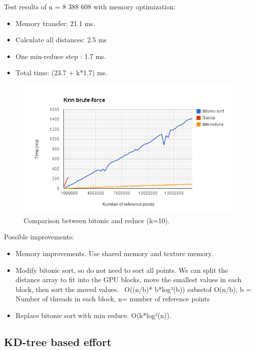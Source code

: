 \begin{enumerate}
\begin{enumerate}
Test results of n = 8 388 608 with memory optimization:
\begin{itemize}
    \item Memory transfer:  21.1 ms.
    \item Calculate all distances: 2.5 ms
    \item One min-reduce step : 1.7 ms.
    \item Total time: (23.7 + k*1.7) ms.
\end{itemize}

\begin{figure}[ht!]
\centering
\includegraphics[width=120mm]{gfx/BitonicVSreduce.png}

\caption{Comparison between bitonic and reduce (k=10).}
\label{fig:bitonic_vs_reduce}
\end{figure}

Possible improvements:

\begin{itemize}
    \item Memory improvements. Use shared memory and texture memory.
    \item Modify bitonic sort, so do not need to sort all points. We can split the distance array to fit into the GPU blocks, move the smallest values in each block, then sort the moved values. ~O((n/b)* b*log²(b)) subsetof O(n/b), b = Number of threads in each block, n= number of reference points
    \item Replace bitonic sort with min reduce. O(k*log²(n)).
\end{itemize}


\subsection{KD-tree based effort} %
\label{sub:kd_tree_based_effort}


\end{enumerate}
\end{enumerate}
